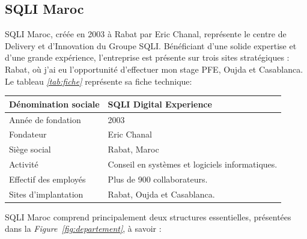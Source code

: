 \subsection{SQLI Maroc}

SQLI Maroc, créée en 2003 à Rabat par Eric Chanal, représente le centre de Delivery et d'Innovation du Groupe SQLI. Bénéficiant d'une solide expertise et d'une grande expérience, l'entreprise est présente sur trois sites stratégiques : Rabat, où j'ai eu l'opportunité d'effectuer mon stage PFE, Oujda et Casablanca. Le tableau \textit{\ref{tab:fiche}} représente sa fiche technique:




\begin{center}
    \captionsetup{type=table}
    \vspace{0.3cm}
    \begin{tabularx}{17cm}{|X|X|}
      \hline
     \textbf{Dénomination sociale}  & \textbf{SQLI Digital Experience} \\
      \hline
     {Année de fondation} & 2003  \\
      \hline
      {Fondateur} & Eric Chanal  \\
      \hline
     {Siège social} & Rabat, Maroc\\
     \hline  
     {Activité} & Conseil en systèmes et logiciels informatiques.\\
      \hline  
     {Effectif des employés} & Plus de 900 collaborateurs.\\
      \hline
     {Sites d'implantation} & Rabat, Oujda et Casablanca.\\
      \hline
    \end{tabularx}
    \label{tab:fiche}
    \end{center}
    

  SQLI Maroc comprend principalement deux structures essentielles, présentées dans la \textit{Figure~\ref{fig:departement}}, à savoir :

